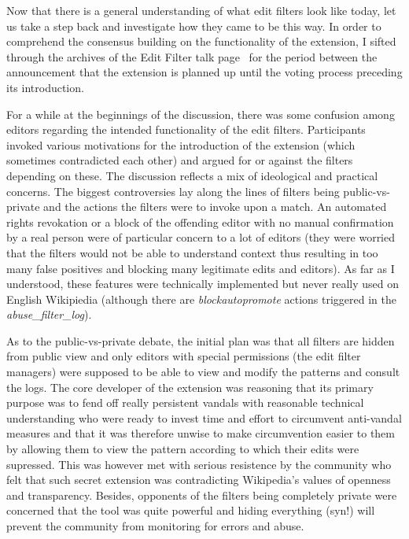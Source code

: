 Now that there is a general understanding of what edit filters look like today, let us take a step back and investigate how they came to be this way.
In order to comprehend the consensus building on the functionality of the extension, I sifted through the archives of the Edit Filter talk page~\cite{Wikipedia:EditFilterTalkArchive1}
for the period between the announcement that the extension is planned up until the voting process preceding its introduction.

For a while at the beginnings of the discussion, there was some confusion among editors regarding the intended functionality of the edit filters.
Participants invoked various motivations for the introduction of the extension (which sometimes contradicted each other) and argued for or against the filters depending on these.
The discussion reflects a mix of ideological and practical concerns.
The biggest controversies lay along the lines of filters being public-vs-private and the actions the filters were to invoke upon a match.
An automated rights revokation or a block of the offending editor with no manual confirmation by a real person were of particular concern to a lot of editors (they were worried that the filters would not be able to understand context thus resulting in too many false positives and blocking many legitimate edits and editors).
As far as I understood, these features were technically implemented but never really used on English Wikipiedia (although there are \emph{blockautopromote} actions triggered in the \emph{abuse\_filter\_log}). %

As to the public-vs-private debate, the initial plan was that all filters are hidden from public view and only editors with special permissions (the edit filter managers) were supposed to be able to view and modify the patterns and consult the logs.
The core developer of the extension was reasoning that its primary purpose was to fend off really persistent vandals with reasonable technical understanding who were ready to invest time and effort to circumvent anti-vandal measures
and that it was therefore unwise to make circumvention easier to them by allowing them to view the pattern according to which their edits were supressed.
This was however met with serious resistence by the community who felt that such secret extension was contradicting Wikipedia's values of openness and transparency.
Besides, opponents of the filters being completely private were concerned that the tool was quite powerful and hiding everything (syn!) will prevent the community from monitoring for errors and abuse.


